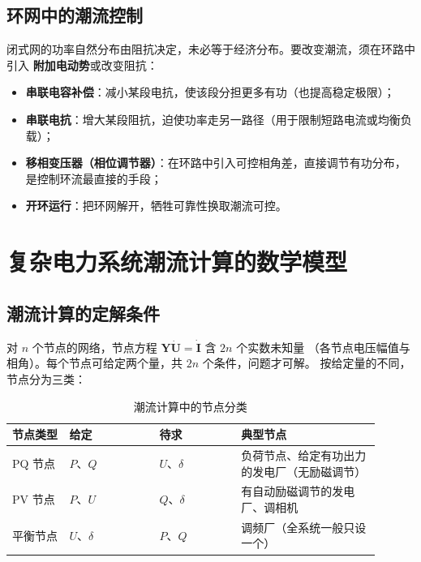 \subsection{环网中的潮流控制}

闭式网的功率自然分布由阻抗决定，未必等于经济分布。要改变潮流，须在环路中引入
\textbf{附加电动势}或改变阻抗：
\begin{itemize}
  \item \textbf{串联电容补偿}：减小某段电抗，使该段分担更多有功（也提高稳定极限）；
  \item \textbf{串联电抗}：增大某段阻抗，迫使功率走另一路径（用于限制短路电流或均衡负载）；
  \item \textbf{移相变压器（相位调节器）}：在环路中引入可控相角差，直接调节有功分布，
        是控制环流最直接的手段；
  \item \textbf{开环运行}：把环网解开，牺牲可靠性换取潮流可控。
\end{itemize}


\section{复杂电力系统潮流计算的数学模型}

\subsection{潮流计算的定解条件}

对 $n$ 个节点的网络，节点方程 $\boldsymbol Y\dot{\boldsymbol U}=\dot{\boldsymbol I}$ 含 $2n$ 个实数未知量
（各节点电压幅值与相角）。每个节点可给定两个量，共 $2n$ 个条件，问题才可解。
按给定量的不同，节点分为三类：

\begin{table}[htbp]
  \centering
  \caption{潮流计算中的节点分类}
  \small
  \begin{tabular}{@{}p{0.14\linewidth}p{0.22\linewidth}p{0.20\linewidth}p{0.34\linewidth}@{}}
    \toprule
    节点类型 & 给定 & 待求 & 典型节点 \\
    \midrule
    PQ 节点 & $P$、$Q$ & $U$、$\delta$ & 负荷节点、给定有功出力的发电厂（无励磁调节） \\
    PV 节点 & $P$、$U$ & $Q$、$\delta$ & 有自动励磁调节的发电厂、调相机 \\
    平衡节点 & $U$、$\delta$ & $P$、$Q$ & 调频厂（全系统一般只设一个） \\
    \bottomrule
  \end{tabular}
\end{table}

